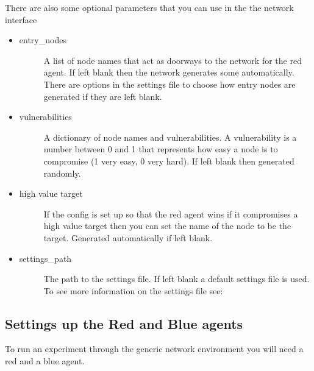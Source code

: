 \documentclass[letterpaper,10pt,english]{sphinxmanual}
\begin{document}
\sphinxAtStartPar
There are also some optional parameters that you can use in the the network interface
\begin{itemize}
\item {} \begin{description}
\item[{entry\_nodes}] \leavevmode
\sphinxAtStartPar
A list of node names that act as doorways to the network for the red agent. If left
blank then the network generates some automatically. There are options in the settings
file to choose how entry nodes are generated if they are left blank.

\end{description}

\item {} \begin{description}
\item[{vulnerabilities}] \leavevmode
\sphinxAtStartPar
A dictionary of node names and vulnerabilities. A vulnerability is a number between 0 and 1
that represents how easy a node is to compromise (1 very easy, 0 very hard). If left
blank then generated randomly.

\end{description}

\item {} \begin{description}
\item[{high value target}] \leavevmode
\sphinxAtStartPar
If the config is set up so that the red agent wins if it compromises a high value
target then you can set the name of the node to be the target. Generated automatically
if left blank.

\end{description}

\item {} \begin{description}
\item[{settings\_path}] \leavevmode
\sphinxAtStartPar
The path to the settings file. If left blank a default settings file is used. To see
more information on the settings file see: {\hyperref[\detokenize{source/config_file:config-file}]{}}

\end{description}

\end{itemize}


\subsection{Settings up the Red and Blue agents}
\label{\detokenize{source/getting_started:settings-up-the-red-and-blue-agents}}
\sphinxAtStartPar
To run an experiment through the generic network environment you will need a red and a
blue agent.
\end{document}
